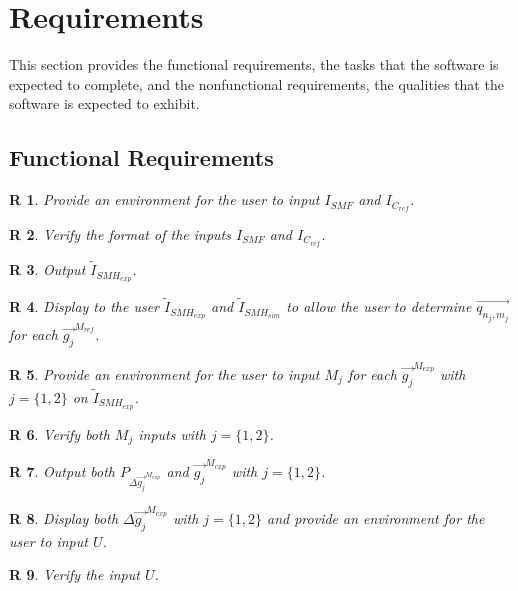 \documentclass[12pt]{article}
\newtheorem{R}{R}
\begin{document}
\section{Requirements}

This section provides the functional requirements, the tasks that the
software is expected to complete, and the nonfunctional requirements, the
qualities that the software is expected to exhibit.

\subsection{Functional Requirements}

\begin{R}
\label{R_1}
\normalfont Provide an environment for the user to input ${I_{SMF}}$ and $I_{C_{ref}}$.
\end{R}
\begin{R}
\label{R_2}
\normalfont Verify the format of the inputs ${I_{SMF}}$ and $I_{C_{ref}}$.
\end{R}
\begin{R}
\label{R_3}
\normalfont Output $\widetilde{I}_{SMH_{exp}}$.
\end{R}
\begin{R}
\label{R_4}
\normalfont Display to the user $\widetilde{I}_{SMH_{exp}}$ and $\widetilde{I}_{SMH_{sim}}$ to allow the user to determine $\overrightarrow{q_{n_j,m_j}}$ for each $\overrightarrow{g_j}^{M_{ref}}$.
\end{R}
\begin{R}
\label{R_5}
\normalfont Provide an environment for the user to input $M_j$ for each $\overrightarrow{g_{j}}^{M_{exp}}$ with $j=\{1,2\}$ on $\widetilde{I}_{SMH_{exp}}$.
\end{R}
\begin{R}
\label{R_6}
\normalfont Verify both $M_j$ inputs with $j=\{1,2\}$.
\end{R}
\begin{R}
\label{R_7}
\normalfont Output both $P_{\Delta \overrightarrow{g_{j}}^{M_{exp}}}$ and $\overrightarrow{g_{j}}^{M_{exp}}$ with $j=\{1,2\}$.
\end{R}
\begin{R}
\label{R_8}
\normalfont Display both $\Delta \overrightarrow{g_{j}}^{M_{exp}}$  with $j=\{1,2\}$ and provide an environment for the user to input $U$.
\end{R}
\begin{R}
\label{R_9}
\normalfont Verify the input $U$.
\end{R}
\end{document}
